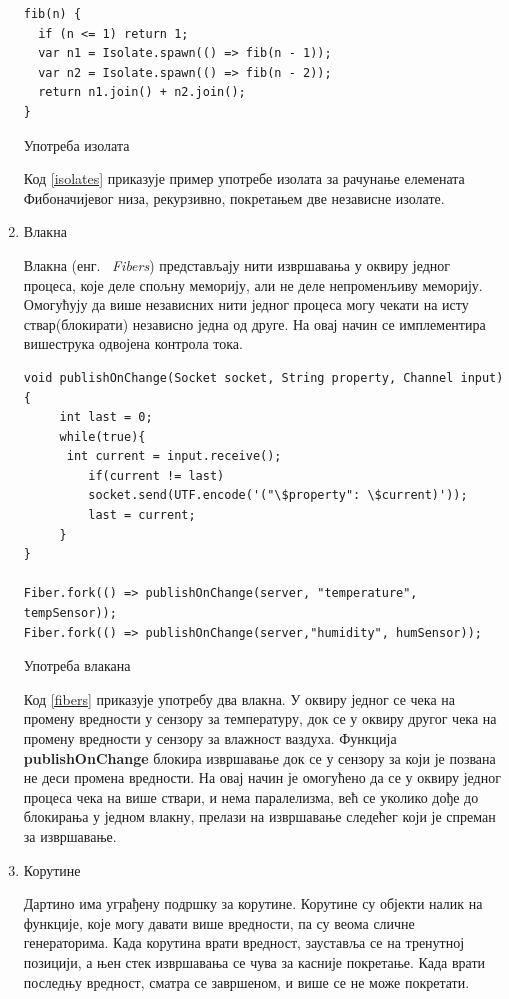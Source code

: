 \documentclass[12pt,oneside]{memoir}
\begin{document}
\begin{enumerate}
\begin{listing}
\begin{verbatim}
fib(n) {
  if (n <= 1) return 1;
  var n1 = Isolate.spawn(() => fib(n - 1));
  var n2 = Isolate.spawn(() => fib(n - 2));
  return n1.join() + n2.join();
}
\end{verbatim}
\caption{Употреба изолата}
\label{isolates}
\end{listing}
Код \ref{isolates} приказује пример употребе изолата за рачунање елемената Фибоначијевог низа, рекурзивно, покретањем две независне изолате.

\item Влакна

Влакна (енг. ~\textit{Fibers}) представљају нити извршавања у оквиру једног процеса, које деле спољну меморију, али не деле непроменљиву меморију. Омогућују да више независних нити једног процеса могу чекати на исту ствар(блокирати) независно једна од друге. На овај начин се имплементира вишеструка одвојена контрола тока.

\begin{listing}
\begin{verbatim}
void publishOnChange(Socket socket, String property, Channel input){
  	 int last = 0;
  	 while(true){
   	  int current = input.receive();
    	 if(current != last)
      	 socket.send(UTF.encode('("\$property": \$current)'));
    	 last = current;
  	 }
}

Fiber.fork(() => publishOnChange(server, "temperature", tempSensor));
Fiber.fork(() => publishOnChange(server,"humidity", humSensor));
\end{verbatim}
\caption{Употреба влакана}
\label{fibers}
\end{listing}

Код \ref{fibers} приказује употребу два влакна. У оквиру једног се чека на промену вредности у сензору за температуру, док се у оквиру другог чека на промену вредности у сензору за влажност ваздуха. Функција \textbf{publishOnChange} блокира извршавање док се у сензору за који је позвана не деси промена вредности. На овај начин је омогућено да се у оквиру једног процеса чека на више ствари, и нема паралелизма, већ се уколико дође до блокирања у једном влакну, прелази на извршавање следећег који је спреман за извршавање.

\item Корутине

Дартино има уграђену подршку за корутине. Корутине су објекти налик на функције, које могу давати више вредности, па су веома сличне генераторима. Када корутина врати вредност, зауставља се на тренутној позицији, а њен стек извршавања се чува за касније покретање. Када врати последњу вредност, сматра се завршеном, и више се не може покретати.


\end{enumerate}
\end{document}

